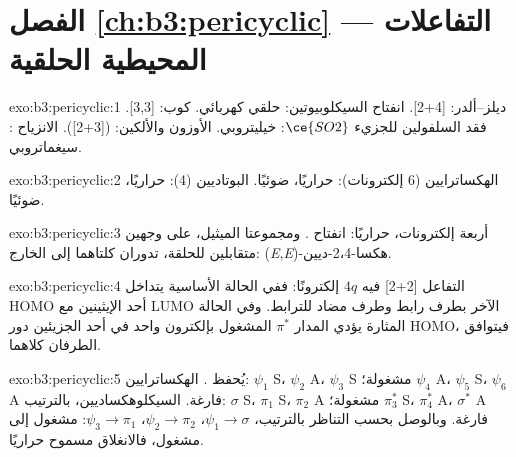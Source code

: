 \section*{الفصل \ref{ch:b3:pericyclic} --- التفاعلات المحيطية الحلقية}

\begin{solution}{exo:b3:pericyclic:1}
ديلز--ألدر:  [4+2]. انفتاح السيكلوبيوتين: حلقي كهربائي. كوب: 
[3,3]. فقد السلفولين للجزيء $\ce{SO2}$: خيليتروبي. الأوزون والألكين: 
([3+2]). الانزياح : سيغماتروبي.
\end{solution}

\begin{solution}{exo:b3:pericyclic:2}
الهكساترايين (6 إلكترونات):  حراريًا،  ضوئيًا.
البوتاديين (4):  حراريًا،  ضوئيًا.
\end{solution}

\begin{solution}{exo:b3:pericyclic:3}
أربعة إلكترونات، حراريًا: انفتاح . ومجموعتا الميثيل، على وجهين متقابلين
للحلقة، تدوران كلتاهما إلى الخارج: (\textit{E},\textit{E})-هكسا-2،4-ديين.
\end{solution}

\begin{solution}{exo:b3:pericyclic:4}
التفاعل [2+2]  فيه $4q$ إلكترونًا: ففي الحالة الأساسية يتداخل HOMO أحد
الإيثينين مع LUMO الآخر بطرف رابط وطرف مضاد للترابط.
وفي الحالة المثارة يؤدي المدار $\pi^*$ المشغول بإلكترون واحد في أحد الجزيئين دور
HOMO، فيتوافق الطرفان كلاهما.
\end{solution}

\begin{solution}{exo:b3:pericyclic:5}
يُحفظ . الهكساترايين: $\psi_1$ S، $\psi_2$ A، $\psi_3$ S مشغولة؛ $\psi_4$ A، $\psi_5$ S، $\psi_6$ A فارغة.
السيكلوهكساديين، بالترتيب: $\sigma$ S، $\pi_1$ S، $\pi_2$ A مشغولة؛ $\pi_3^*$ S، $\pi_4^*$ A، $\sigma^*$ A فارغة. وبالوصل بحسب
التناظر بالترتيب، $\psi_1 \to \sigma$، $\psi_2 \to \pi_2$، $\psi_3 \to \pi_1$: مشغول إلى مشغول، فالانغلاق 
مسموح حراريًا.
\end{solution}

